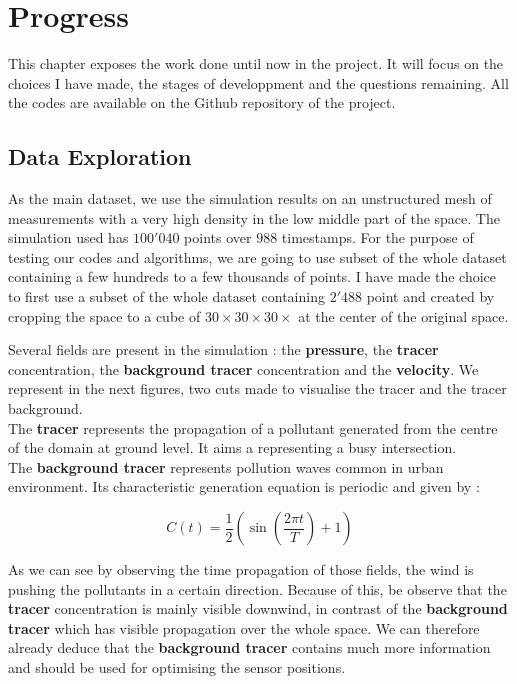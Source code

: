 \chapter{Progress}

This chapter exposes the work done until now in the project. It will focus on the choices I have made, the stages of developpment and the questions remaining. All the codes are available on the Github repository of the project.


\section{Data Exploration}

As the main dataset, we use the simulation results on an unstructured mesh of measurements with a very high density in the low middle part of the space. The simulation used has $100'040$ points over $988$ timestamps. For the purpose of testing our codes and algorithms,  we are going to use subset of the whole dataset containing a few hundreds to a few thousands of points. I have made the choice to first use a subset of the whole dataset containing $2'488$ point and created by cropping the space to a cube of $30\times30\times30\times$ at the center of the original space. 


 Several fields are present in the simulation : the \textbf{pressure}, the \textbf{tracer} concentration, the \textbf{background tracer} concentration and the \textbf{velocity}. We represent in the next figures, two cuts made to visualise the tracer and the tracer background. \\ 

The \textbf{tracer} represents the propagation of a pollutant generated from the centre of the domain at ground level. It aims a representing a busy intersection. \\

The \textbf{background tracer} represents pollution waves common in urban environment. Its characteristic generation equation is periodic and given by : 

\begin{equation}
	C(t)= \frac{1}{2} \left( \sin \left( \frac{2\pi t}{T} \right) + 1 \right)
\end{equation}



As we can see by observing the time propagation of those fields,  the wind is pushing the pollutants in a certain direction. Because of this, be observe that the \textbf{tracer} concentration is mainly visible downwind, in contrast of the \textbf{background tracer} which has visible propagation over the whole space. We can therefore already deduce that the \textbf{background tracer} contains much more information and should be used for optimising the sensor positions. 


